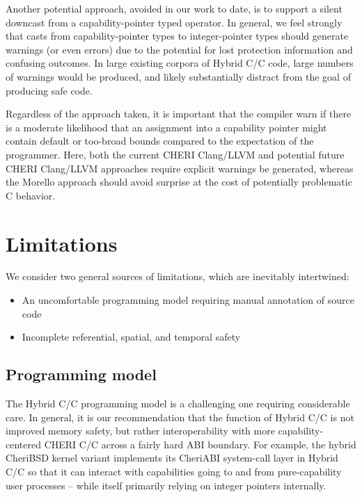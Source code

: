 \documentclass[12pt,twoside,openright,a4paper]{article}
\newcommand{\ccode}[1]{{\small\ttfamily{#1}}}
\newcommand*{\cpp}{\texorpdfstring{C\textsmaller[2]{\protect\nolinebreak[4]\hspace{-.05em}\raisebox{.45ex}{\textbf{++}}}}{C++}}
\newcommand*{\COrCpp}{C/\cpp{}}
\newcommand*{\purecapCOrCpp}{CHERI \COrCpp{}}
\newcommand*{\hybridCOrCpp}{Hybrid \COrCpp{}}
\begin{document}
Another potential approach, avoided in our work to date, is to support a
silent downcast from a capability-pointer typed \ccode{\&} operator.
In general, we feel strongly that casts from capability-pointer types to
integer-pointer types should generate warnings (or even errors) due to the
potential for lost protection information and confusing outcomes.
In large existing corpora of \hybridCOrCpp{} code, large numbers of warnings
would be produced, and likely substantially distract from the goal of
producing safe code.

Regardless of the approach taken, it is important that the compiler warn if
there is a moderate likelihood that an assignment into a capability pointer
might contain default or too-broad bounds compared to the expectation of the
programmer.
Here, both the current CHERI Clang/LLVM and potential future CHERI Clang/LLVM
approaches require explicit warnings be generated, whereas the Morello
approach should avoid surprise at the cost of potentially problematic C
behavior.

\section{Limitations}

We consider two general sources of limitations, which are inevitably
intertwined:

\begin{itemize}
\item An uncomfortable programming model requiring manual annotation of
  source code
\item Incomplete referential, spatial, and temporal safety
\end{itemize}

\subsection{Programming model}

The \hybridCOrCpp{} programming model is a challenging one requiring
considerable care.
In general, it is our recommendation that the function of \hybridCOrCpp{} is
not improved memory safety, but rather interoperability with more
capability-centered \purecapCOrCpp{} across a fairly hard ABI boundary.
For example, the hybrid CheriBSD kernel variant implements its CheriABI
system-call layer in \hybridCOrCpp{} so that it can interact with capabilities
going to and from pure-capability user processes -- while itself primarily
relying on integer pointers internally.
\end{document}
